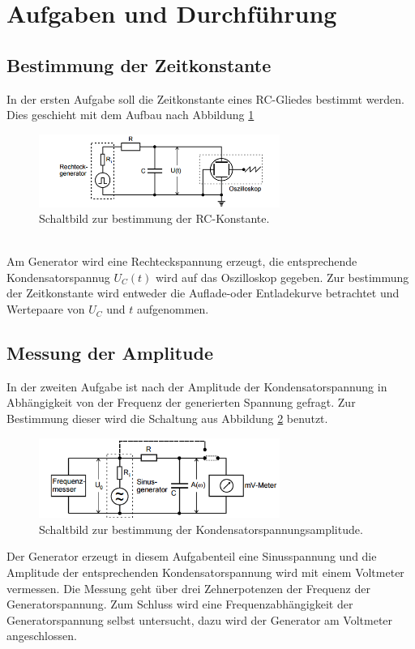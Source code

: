 \section{Aufgaben und Durchführung}
\label{sec:Durchführung}
\subsection{Bestimmung der Zeitkonstante}
In der ersten Aufgabe soll die Zeitkonstante eines RC-Gliedes bestimmt werden.
Dies geschieht mit dem Aufbau nach Abbildung \ref{abb:schaltbildRC}
\begin{figure}[h]
    \centering
    \includegraphics[width=0.7\textwidth]{aufbaua.PNG}
    \caption{Schaltbild zur bestimmung der RC-Konstante.\cite{skript}}
    \label{abb:schaltbildRC}
\end{figure}\\
Am Generator wird eine Rechteckspannung erzeugt, die entsprechende Kondensatorspannug $U_C(t)$ wird auf das Oszilloskop gegeben.
Zur bestimmung der Zeitkonstante wird entweder die Auflade-oder Entladekurve betrachtet und Wertepaare von $U_C$ und $t$ aufgenommen.
\subsection{Messung der Amplitude}
In der zweiten Aufgabe ist nach der Amplitude der Kondensatorspannung in Abhängigkeit von der Frequenz der generierten Spannung gefragt.
Zur Bestimmung dieser wird die Schaltung aus Abbildung \ref{abb:schaltbildAmplitude} benutzt.
\begin{figure}[h]
    \centering
    \includegraphics[width=0.7\textwidth]{aufbaub.PNG}
    \caption{Schaltbild zur bestimmung der Kondensatorspannungsamplitude.\cite{skript}}
    \label{abb:schaltbildAmplitude}
\end{figure}
\newpage
Der Generator erzeugt in diesem Aufgabenteil eine Sinusspannung und die Amplitude der entsprechenden Kondensatorspannung wird mit einem Voltmeter vermessen.
Die Messung geht über drei Zehnerpotenzen der Frequenz der Generatorspannung.
Zum Schluss wird eine Frequenzabhängigkeit der Generatorspannung selbst untersucht, dazu wird der Generator am Voltmeter angeschlossen.
